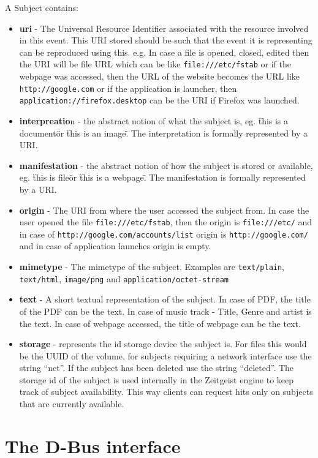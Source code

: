 \noindent
A Subject contains:
\begin{itemize}
\item \textbf{uri} - The Universal Resource Identifier associated with the resource involved 
in this event. This URI stored should be such that the event it is representing can 
be reproduced using this. e.g. In case a file is opened, closed, edited then the URI 
will be file URL which can be like \texttt{file:///etc/fstab} or if the webpage was 
accessed, then the URL of the website becomes the URL like \texttt{http://google.com} 
or if the application is launcher, then \texttt{application://firefox.desktop} 
can be the URI if Firefox was launched.
\item \textbf{interpreatio}n - the abstract notion of what the subject is, eg. \"this is a document\" or \"this is an image\". The interpretation is formally represented by a URI.
\item \textbf{manifestation} - the abstract notion of how the subject is stored or available, eg. \"this is file\" or \"this is a webpage\". The manifestation is formally represented by a URI.
\item \textbf{origin} - The URI from where the user accessed the subject from. In case the user 
opened the file \texttt{file:///etc/fstab}, then the origin is \texttt{file:///etc/} and 
in case of \texttt{http://google.com/accounts/list} origin is \texttt{http://google.com/} 
and in case of application launches origin is empty.
\item \textbf{mimetype} - The mimetype of the subject. Examples are \texttt{text/plain}, 
\texttt{text/html}, \texttt{image/png} and \texttt{application/octet-stream}
\item \textbf{text} - A short textual representation of the subject. In case of PDF, the title of 
the PDF can be the text. In case of music track - Title, Genre and artist is the text. In 
case of webpage accessed, the title of webpage can be the text.
\item \textbf{storage} -  represents the id storage device the subject is. For files this would be the UUID of the volume, for subjects requiring a network interface use the 
string “net”. If the subject has been deleted use the string “deleted”. The storage id 
of the subject is used internally in the Zeitgeist engine to keep track of subject 
availability. This way clients can request hits only on subjects that are 
currently available.
\end{itemize}

\section{The D-Bus interface}

